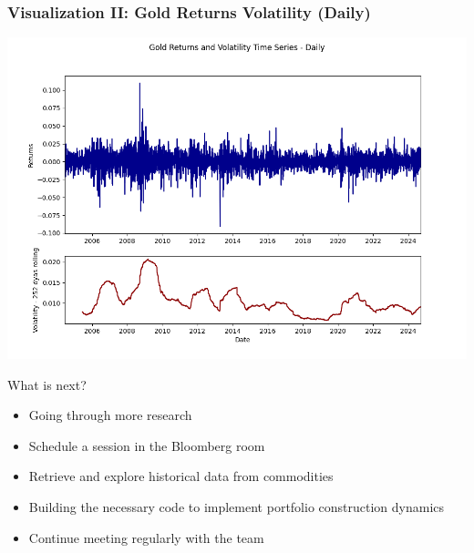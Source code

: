 \documentclass[9pt]{beamer}  %
\begin{document}
\begin{frame}
    \frametitle{Visualization II: Gold Returns Volatility (Daily)}  %
    \begin{center}
        \includegraphics[width=\textwidth, height=0.8\textheight, keepaspectratio]{gold_returns_volatility_daily.png}  %
    \end{center}
\end{frame}



\begin{frame}{What is next?}
    \begin{YStkyNote}[To do next:]
    \begin{itemize}
        \item Going through more research
        \item Schedule a session in the Bloomberg room
        \item Retrieve and explore historical data from commodities
        \item Building the necessary code to implement portfolio construction dynamics
        \item Continue meeting regularly with the team
    \end{itemize}
    \end{YStkyNote}
\end{frame}
\end{document}
